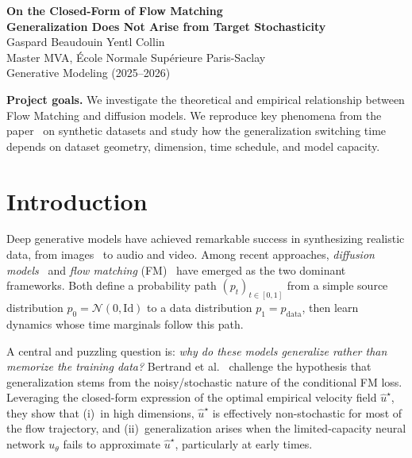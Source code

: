 \documentclass[10pt,a4paper]{article}
\theoremstyle{definition}
\newcommand{\cN}{\mathcal{N}}
\newcommand{\Id}{\mathrm{Id}}
\begin{document}
\begin{center}
    {\LARGE\bfseries\color{TitleColor}
    On the Closed-Form of Flow Matching}\\[0.25em]
    {\large\bfseries\color{TitleColor}
    Generalization Does Not Arise from Target Stochasticity}\\[0.9em]

    {\large Gaspard Beaudouin \hspace{1cm} Yentl Collin}\\[0.25em]
    {\normalsize Master MVA, \'Ecole Normale Sup\'erieure Paris-Saclay}\\[0.25em]
    {\normalsize Generative Modeling (2025--2026)}
\end{center}

\vspace{0.5em}

\begin{highlightbox}
\textbf{Project goals.}
We investigate the theoretical and empirical relationship between Flow Matching and diffusion models.
We reproduce key phenomena from the paper~\cite{bertrand2025closed} on synthetic datasets and study how the generalization switching time depends on dataset geometry, dimension, time schedule, and model capacity.
\end{highlightbox}

\section{Introduction}

Deep generative models have achieved remarkable success in synthesizing realistic data, from images~\cite{ho2020denoising} to audio and video.
Among recent approaches, \emph{diffusion models}~\cite{song2021score,ho2020denoising} and \emph{flow matching} (FM)~\cite{lipman2023flow,liu2023flow,albergo2023building} have emerged as the two dominant frameworks.
Both define a probability path $(p_t)_{t\in[0,1]}$ from a simple source distribution $p_0 = \cN(0,\Id)$ to a data distribution $p_1 = p_{\mathrm{data}}$, then learn dynamics whose time marginals follow this path.

A central and puzzling question is: \emph{why do these models generalize rather than memorize the training data?}
Bertrand et al.~\cite{bertrand2025closed} challenge the hypothesis that generalization stems from the noisy/stochastic nature of the conditional FM loss.
Leveraging the closed-form expression of the optimal empirical velocity field $\hat{u}^\star$, they show that (i)~in high dimensions, $\hat{u}^\star$ is effectively non-stochastic for most of the flow trajectory, and (ii)~generalization arises when the limited-capacity neural network $u_\theta$ fails to approximate $\hat{u}^\star$, particularly at early times.
\end{document}

